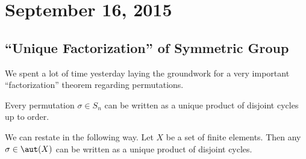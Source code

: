 \section{September 16, 2015}

\subsection{``Unique Factorization'' of Symmetric Group}
We spent a lot of time yesterday laying the groundwork for a very
important ``factorization'' theorem regarding permutations.

\begin{thm}
Every permutation $\sigma \in S_n$ can be written as a unique product of
disjoint cycles up to order.

We can restate in the following way. Let $X$ be a set of finite
elements. Then any $\sigma \in \aut(X)$ can be written as a unique
product of disjoint cycles.
\end{thm}

